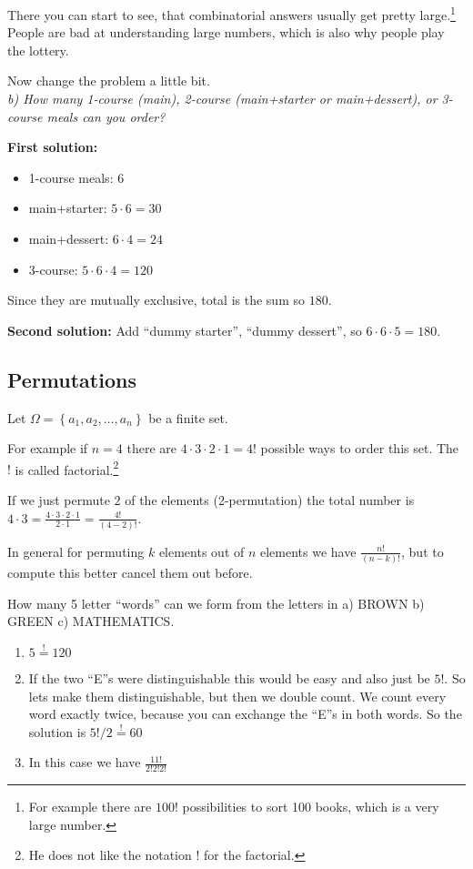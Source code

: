 \documentclass[english]{lbscript}
\begin{document}
There you can start to see, that combinatorial answers usually get pretty large.\footnote{For example there are \(100!\) possibilities to sort 100 books, which is a very large number.} People are bad at understanding large numbers, which is also why people play the lottery.

Now change the problem a little bit. \\
\emph{b) How many 1-course (main), 2-course (main+starter or main+dessert), or 3-course meals can you order?}

\textbf{First solution:}
\begin{itemize}
	\item 1-course meals: \(6\)
	\item main+starter: \(5⋅6=30\)
	\item main+dessert: \(6⋅4=24\)
	\item 3-course: \(5⋅6⋅4=120\)
\end{itemize}
Since they are mutually exclusive, total is the sum so \(180\).

\textbf{Second solution:}
Add ``dummy starter'', ``dummy dessert'', so \(6⋅6⋅5=180\).


\subsection{Permutations}
\label{sec:permutations}

Let \(𝛺=\left\{ a_1,a_2,\dots, a_n \right\} \) be a finite set.

For example if \(n=4\) there are \(4⋅3⋅2⋅1=4!\) possible ways to order this set. The \(!\) is called factorial.\footnote{He does not like the notation ! for the factorial.}

If we just permute \(2\) of the elements (2-permutation) the total number is \(4⋅3= \frac{4⋅3⋅2⋅1}{2⋅1}= \frac{4!}{(4-2)!}\).

In general for permuting \(k\) elements out of \(n\) elements we have \(\frac{n!}{(n-k)!}\), but to compute this better cancel them out before.

\begin{example}{How many 5 letter ``words'' can we form from the letters in a) BROWN b) GREEN c) MATHEMATICS.}{}
	\begin{enumerate}[label=\alph{*})]
		\item\label{item:1} \(5\overset{!}{=}120\)
		\item\label{item:2} If the two ``E''s were distinguishable this would be easy and also just be \(5!\). So lets make them distinguishable, but then we double count. We count every word exactly twice, because you can exchange the ``E''s in both words. So the solution is \(5!/2\overset{!}{=}60\)
		\item\label{item:3} In this case we have \(\frac{11!}{2!2!2!}\)
	\end{enumerate}
\end{example}
\end{document}
